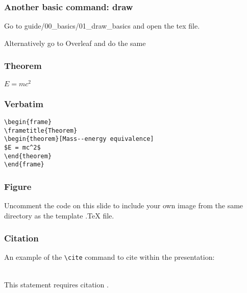 \documentclass{beamer}
\begin{document}

\begin{frame}
    \frametitle{Another basic command: draw}

    Go to guide/00_basics/01_draw_basics and open the tex file.

    Alternatively go to Overleaf and do the same

\end{frame}


\begin{frame}
\frametitle{Theorem}
\begin{theorem}
$E = mc^2$
\end{theorem}
\end{frame}


\begin{frame}[fragile] %
\frametitle{Verbatim}
\begin{example}
\begin{verbatim}
\begin{frame}
\frametitle{Theorem}
\begin{theorem}[Mass--energy equivalence]
$E = mc^2$
\end{theorem}
\end{frame}\end{verbatim}
\end{example}
\end{frame}


\begin{frame}
\frametitle{Figure}
Uncomment the code on this slide to include your own image from the same directory as the template .TeX file.
\end{frame}


\begin{frame}[fragile] %
\frametitle{Citation}
An example of the \verb|\cite| command to cite within the presentation:\\~

This statement requires citation \cite{p1}.
\end{frame}
\end{document}
